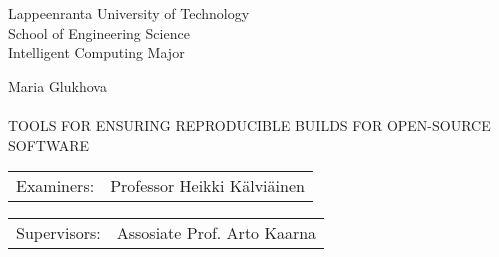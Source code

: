 
\thispagestyle{empty} 
\setlength{\parindent}{0pt}
Lappeenranta University of Technology\\
School of Engineering Science\\
Intelligent Computing Major\\


\vspace{60mm}

{\sffamily\large Maria Glukhova\\
\\
\MakeUppercase{\Large Tools for Ensuring Reproducible Builds for Open-Source Software}}\\



\begin{tabular}{l p{11.0cm}}  
  
Examiners: & Professor \foreignlanguage{finnish}{Heikki Kälviäinen}\\

\end {tabular}

\begin{tabular}{l p{11.0cm}}  
  
Supervisors: & Assosiate Prof. Arto Kaarna\\

\end {tabular}






\pagebreak

